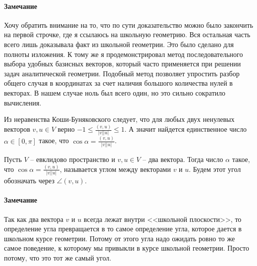 \paragraph{Замечание} 
Хочу обратить внимание на то, что по сути доказательство можно было закончить на первой строчке, где я ссылаюсь  на школьную геометрию. Вся остальная часть всего лишь доказывала факт из школьной геометрии. Это было сделано для полноты изложения. К тому же я продемонстрировал метод последовательного выбора удобных базисных векторов, который часто применяется при решении задач аналитической геометрии. Подобный метод позволяет упростить разбор общего случая в координатах за счет наличия большого количества нулей в векторах. В нашем случае ноль был всего один, но это сильно сократило вычисления.

Из неравенства Коши-Буняковского следует, что для любых двух ненулевых векторов $v,u\in V$ верно $-1\leqslant \frac{(v,u)}{|v| |u|}\leqslant 1$. А значит найдется единственное число $\alpha\in [0,\pi]$ такое, что $\cos \alpha = \frac{(v,u)}{|v| |u|}$.

\begin{definition}
Пусть $V$ -- евклидово пространство и $v,u\in V$ -- два вектора. Тогда число $\alpha$ такое, что $\cos \alpha = \frac{(v,u)}{|v| |u|}$, называется углом между векторами $v$ и $u$. Будем этот угол обозначать через $\angle(v, u)$.
\end{definition}

\paragraph{Замечание}
Так как два вектора $v$ и $u$ всегда лежат внутри <<школьной плоскости>>, то определение угла превращается в то самое определение угла, которое дается в школьном курсе геометрии. Потому от этого угла надо ожидать ровно то же самое поведение, к которому мы привыкли в курсе школьной геометрии. Просто потому, что это тот же самый угол.


